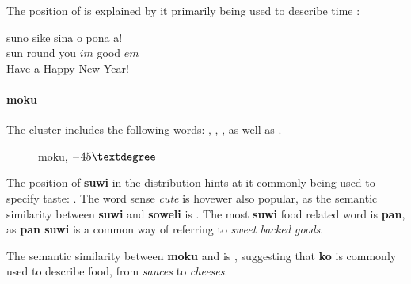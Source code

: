 \documentclass[14pt, a4paper]{extreport}
\makeatletter
\DeclareRobustCommand\ttfamily
        {\not@math@alphabet\ttfamily\mathtt
         \fontfamily\ttdefault\small\selectfont}
\makeatother
\begin{document}
The position of  is explained by it primarily being used to describe time :

\begin{exe}
  \ex
  \gll suno sike sina o pona a! \\
       sun round you $im$ good $em$ \\
  \glt Have a Happy New Year!
\end{exe}
        \paragraph{moku}
The  cluster includes the following words: , , , as well as .

\begin{figure}[ht]%
  \def\angle{-45}
  \bigskip
  \centering
  \caption{moku, \(\angle\textdegree\)}
\end{figure}%

The position of \textbf{suwi} in the distribution hints at it commonly being used to specify taste: . The word sense \textit{cute} is hovewer also popular, as the semantic similarity between \textbf{suwi} and \textbf{soweli} is . The most \textbf{suwi} food related word is \textbf{pan}, as \textbf{pan suwi} is a common way of referring to \textit{sweet backed goods}.

The semantic similarity between \textbf{moku} and  is , suggesting that \textbf{ko} is commonly used to describe food, from \textit{sauces} to \textit{cheeses}.
\end{document}
